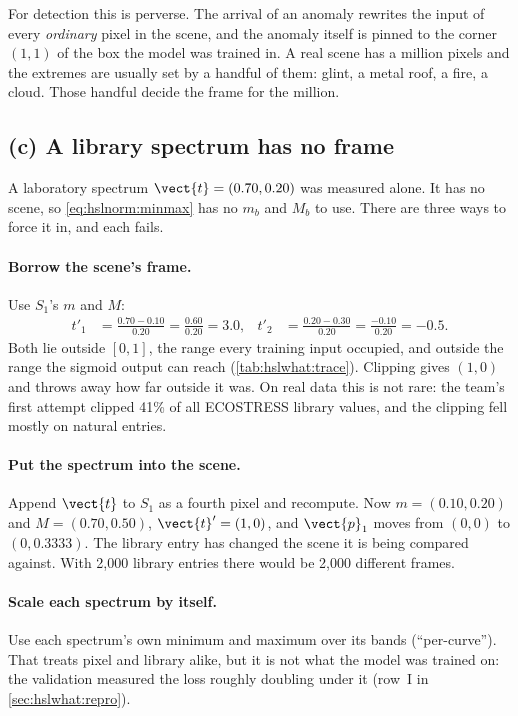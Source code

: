 For detection this is perverse. The arrival of an anomaly rewrites the input of every \emph{ordinary} pixel in the
scene, and the anomaly itself is pinned to the corner $(1,1)$ of the box the model was trained in. A real scene has a
million pixels and the extremes are usually set by a handful of them: glint, a metal roof, a fire, a cloud. Those
handful decide the frame for the million.

\subsection{(c) A library spectrum has no frame}

A laboratory spectrum $\vect{t}=(0.70,0.20)$\tagA{} was measured alone. It has no scene, so \cref{eq:hslnorm:minmax}
has no $m_b$ and $M_b$ to use. There are three ways to force it in, and each fails.

\paragraph{Borrow the scene's frame.} Use $S_1$'s $m$ and $M$:
\begin{align*}
t'_1 &= \frac{0.70-0.10}{0.20} = \frac{0.60}{0.20} = 3.0, & t'_2 &= \frac{0.20-0.30}{0.20} = \frac{-0.10}{0.20} = -0.5 .
\end{align*}
Both lie outside $[0,1]$, the range every training input occupied, and outside the range the sigmoid output can
reach (\cref{tab:hslwhat:trace}). Clipping gives $(1,0)$ and throws away how far outside it was. On real data this is
not rare: the team's first attempt clipped 41\% of all ECOSTRESS library values, and the clipping fell mostly on
natural entries\tbrk{}.

\paragraph{Put the spectrum into the scene.} Append $\vect{t}$ to $S_1$ as a fourth pixel and recompute. Now
$m=(0.10,0.20)$ and $M=(0.70,0.50)$, $\vect{t}'=(1,0)$, and $\vect{p}_1$ moves from $(0,0)$ to $(0,0.3333)$\tagC. The
library entry has changed the scene it is being compared against. With 2,000 library entries there would be 2,000
different frames.

\paragraph{Scale each spectrum by itself.} Use each spectrum's own minimum and maximum over its bands (``per-curve'').
That treats pixel and library alike, but it is not what the model was trained on: the validation measured the loss
roughly doubling under it (row~I in \cref{sec:hslwhat:repro}).

